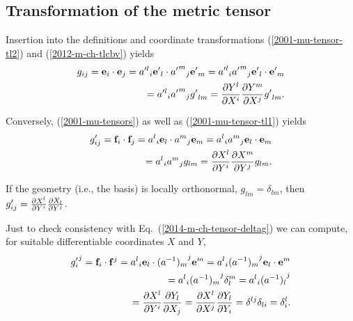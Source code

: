 \subsection{Transformation of the metric tensor}

Insertion into the definitions and coordinate transformations
 (\ref{2001-mu-tensor-tl2}) and (\ref{2012-m-ch-tlcbv})
yields
\begin{equation}
\begin{split}
g_{ij}={\bf e}_i\cdot {\bf e}_j
={a'^l}_i{\bf e'}_l\cdot {{a'}^m}_j{\bf e'}_m
={a'^l}_i{{a'}^m}_j {\bf e'}_l\cdot {\bf e'}_m \\
= {a'^l}_i{{a'}^m}_j  {g'}_{lm}
= {\partial { Y }^l\over \partial X^i}{\partial { Y }^m\over \partial X^j} {g'}_{lm}
.
\label{2011-m-emtdc}
\end{split}
\end{equation}

Conversely,  (\ref{2001-mu-tensors}) as well as    (\ref{2001-mu-tensor-tl1})
yields
\begin{equation}
\begin{split}
g'_{ij}={\bf f}_i\cdot {\bf f}_j
={a^l}_i{\bf e}_l\cdot {a^m}_j{\bf e}_m
={a^l}_i {a^m}_j {\bf e}_l\cdot {\bf e}_m  \\
= {a^l}_i {a^m}_j  {g}_{lm}
= {\partial {X}^l\over \partial { Y }^i}{\partial {X}^m\over \partial { Y }^j} {g}_{lm}
.
\end{split}
\end{equation}


If the geometry (i.e., the basis) is locally orthonormal, ${g}_{lm}=\delta_{lm}$,
then
$g'_{ij}={\partial {X}^l\over \partial { Y }^i}{\partial {X}_l\over \partial { Y }^j}$.

Just to check consistency with Eq.~(\ref{2014-m-ch-tensor-deltag}) we can compute,
for suitable differentiable coordinates $X$ and $ Y $,
\begin{equation}
\begin{split}
{g'_i}^j={\bf f}_i\cdot {{\bf f}}^j
={a^l}_i{\bf e}_l\cdot {(a^{-1})_m}^j{\bf e}^m
={a^l}_i {(a^{-1})_m}^j {\bf e}_l\cdot {\bf e}^m  \\
= {a^l}_i {(a^{-1})_m}^j \delta_l^m
= {a^l}_i {(a^{-1})_l}^j  \\
= {\partial {X}^l\over \partial { Y }^i}{\partial { Y }_l\over \partial {X}_j}
= {\partial {X}^l\over \partial {X}^j}{\partial { Y }_l\over \partial { Y }_i}
= \delta^{lj}\delta_{li}
= \delta^l_i
.
\end{split}
\end{equation}

